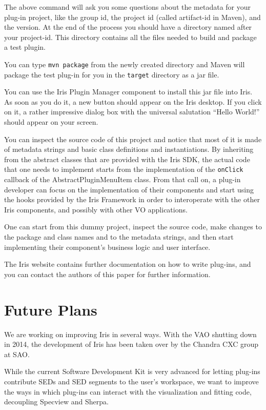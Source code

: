 \documentclass[final,5p,authoryear]{elsarticle}
\begin{document}
The above command will ask you some questions about the metadata for your
plug-in project, like the group id, the project id (called artifact-id in
Maven), and the version. At the end of the process you should have a directory
named after your project-id. This directory contains all the files needed to
build and package a test plugin.

You can type \verb|mvn package| from the newly created directory and Maven will
package the test plug-in for you in the \verb|target| directory as a jar file.

You can use the Iris Plugin Manager component to install this jar file into
Iris. As soon as you do it, a new button should appear on the Iris desktop. If
you click on it, a rather impressive dialog box with the universal salutation
``Hello World!'' should appear on your screen.

You can inspect the source code of this project and notice that most of it is
made of metadata strings and basic class definitions and instantiations. By
inheriting from the abstract classes that are provided with the Iris SDK, the
actual code that one needs to implement starts from the implementation of the
\verb|onClick| callback of the AbstractPluginMenuItem class. From that call on,
a plug-in developer can focus on the implementation of their components and
start using the hooks provided by the Iris Framework in order to interoperate
with the other Iris components, and possibly with other VO applications.

One can start from this dummy project, inspect the source code, make changes to
the package and class names and to the metadata strings, and then start
implementing their component's business logic and user interface.

The Iris website contains further documentation on how to write plug-ins, and
you can contact the authors of this paper for further information.

\section{Future Plans} We are working on improving Iris in several ways. With
the VAO shutting down in 2014, the development of Iris has been taken over by
the Chandra CXC group at SAO.

While the current Software Development Kit is very advanced for letting plug-ins
contribute SEDs and SED segments to the user's workspace, we want to improve the
ways in which plug-ins can interact with the visualization and fitting code,
decoupling Specview and Sherpa.
\end{document}
